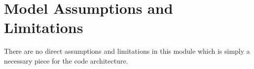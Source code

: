 \section{Model Assumptions and Limitations}

There are no direct assumptions and limitations in this module which is simply a necessary piece for the code architecture. 
